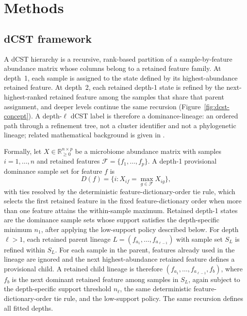 \documentclass[11pt]{article}
\begin{document}
\FloatBarrier

\section{Methods}

\subsection{dCST framework}\label{sec:dcst-framework}

A dCST hierarchy is a recursive, rank-based partition of a sample-by-feature
abundance matrix whose columns belong to a retained feature family. At depth~1,
each sample is assigned to the state defined by its highest-abundance retained
feature. At depth~2, each retained depth-1 state is refined by the
next-highest-ranked retained feature among the samples that share that parent
assignment, and deeper levels continue the same recursion
(Figure~\ref{fig:dcst-concept}). A depth-$\ell$ dCST
label is therefore a dominance-lineage: an ordered path through a refinement
tree, not a cluster identifier and not a phylogenetic lineage; related
mathematical background is given in \cite{Gajer2025_linf}.

Formally, let \(X \in \mathbb{R}_{\geq 0}^{n \times p}\) be a microbiome
abundance matrix with samples \(i = 1,\ldots,n\) and retained features
\(\mathcal{F} = \{f_1,\ldots,f_p\}\). A depth-1 provisional dominance sample
set for feature \(f\) is
\[
D(f) = \{i : X_{if} = \max_{g \in \mathcal{F}} X_{ig}\},
\]
with ties resolved by the deterministic feature-dictionary-order tie rule, which
selects the first retained feature in the fixed feature-dictionary order when
more than one feature attains the within-sample maximum. Retained
depth-1 states are the dominance sample sets whose support
satisfies the depth-specific minimum \(n_1\), after applying the low-support
policy described below. For
depth \(\ell > 1\), each retained parent lineage
\(L = (f_{a_1},\ldots,f_{a_{\ell-1}})\) with sample set \(S_L\) is refined
within \(S_L\). For each sample in the parent, features already used in the
lineage are ignored and the next highest-abundance retained feature defines a
provisional child. A retained child lineage is therefore
\((f_{a_1},\ldots,f_{a_{\ell-1}}, f_b)\), where \(f_b\) is the next dominant
retained feature among samples in \(S_L\), again subject to the depth-specific
support threshold \(n_\ell\), the same deterministic feature-dictionary-order
tie rule, and the low-support policy. The same recursion defines all fitted
depths.
\end{document}
